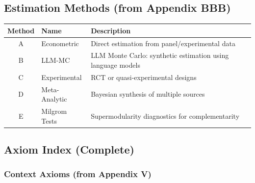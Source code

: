 \subsection{Estimation Methods (from Appendix BBB)}
\label{sec:glossary-methods}

\begin{center}
\renewcommand{\arraystretch}{1.3}
\begin{tabular}{@{}clp{7cm}@{}}
\toprule
\textbf{Method} & \textbf{Name} & \textbf{Description} \\
\midrule
A & Econometric & Direct estimation from panel/experimental data \\
B & LLM-MC & LLM Monte Carlo: synthetic estimation using language models \\
C & Experimental & RCT or quasi-experimental designs \\
D & Meta-Analytic & Bayesian synthesis of multiple sources \\
E & Milgrom Tests & Supermodularity diagnostics for complementarity \\
\bottomrule
\end{tabular}
\end{center}

\subsection{Axiom Index (Complete)}
\label{sec:glossary-axioms}

\subsubsection{Context Axioms (from Appendix V)}

